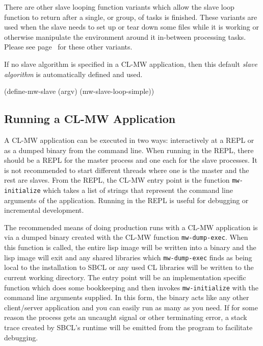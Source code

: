 \documentclass[titlepage,12pt]{book}
\newcommand{\xsmall}{\latexhtml{\small}{}}
\newcommand{\xnormalsize}{\latexhtml{\normalsize}{}}
\newcommand{\clmw}{\xsmall\textsc{CL-MW}\xnormalsize\xspace}
\newcommand{\sa}{\textit{slave algorithm}\xspace}
\newcommand{\func}[1]{\mbox{\texttt{#1}}\xspace}
\begin{document}
There are other slave looping function variants which allow the
slave loop function to return after a single, or group, of tasks
is finished.  These variants are used when the slave needs to set up
or tear down some files while it is working or otherwise manipulate
the environment around it in-between processing tasks. Please see
page~\pageref{slave-algorithm-api} for these other variants.

If no slave algorithm is specified in a \clmw application, then this
default \sa is automatically defined and used.

\begin{lisp}[caption=Default Slave Algorithm]
(define-mw-slave (argv)
  (mw-slave-loop-simple))
\end{lisp}

\subsection{Running a \clmw Application}

A \clmw application can be executed in two ways: interactively at a
REPL or as a dumped binary from the command line. When running in the
REPL, there should be a REPL for the master process and one each for
the slave processes. It is not recommended to start different threads
where one is the master and the rest are slaves.  From the REPL,
the \clmw entry point is the function \func{mw-initialize} which
takes a list of strings that represent the command line arguments
of the application. Running in the REPL is useful for debugging or
incremental development.

The recommended means of doing production runs with a \clmw
application is via a dumped binary created with the \clmw function
\func{mw-dump-exec}. When this function is called, the entire lisp
image will be written into a binary and the lisp image will exit
and any shared libraries which \func{mw-dump-exec} finds as being
local to the installation to SBCL or any used CL libraries will be
written to the current working directory. The entry point will be an
implementation specific function which does some bookkeeping and then
invokes \func{mw-initialize} with the command line arguments supplied.
In this form, the binary acts like any other client/server application
and you can easily run as many as you need.  If for some reason the
process gets an uncaught signal or other terminating error, a stack
trace created by SBCL's runtime will be emitted from the program to
facilitate debugging.
\end{document}
